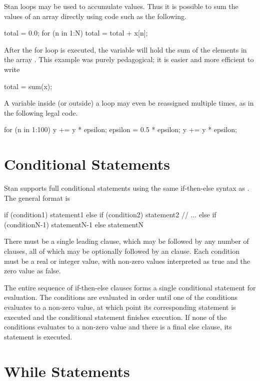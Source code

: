 Stan loops may be used to accumulate values.  Thus it is possible to
sum the values of an array directly using code such as the
following.
%
\begin{stancode}
total = 0.0;
for (n in 1:N)
  total = total + x[n];
\end{stancode}
%
After the for loop is executed, the variable  will hold
the sum of the elements in the array .  This example was
purely pedagogical; it is easier and more efficient to write
%
\begin{stancode}
total = sum(x);
\end{stancode}

A variable inside (or outside) a loop may even be reassigned multiple
times, as in the following legal code.
%
\begin{stancode}
for (n in 1:100) {
  y += y * epsilon;
  epsilon = 0.5 * epsilon;
  y += y * epsilon;
}
\end{stancode}

\section{Conditional Statements}

Stan supports full conditional statements using
the same if-then-else syntax as \Cpp.  The general format is
%
\begin{stancode}
if (condition1)
  statement1
else if (condition2)
  statement2
// ...
else if (conditionN-1)
  statementN-1
else
  statementN
\end{stancode}
%
There must be a single leading  clause, which may be followed
by any number of  clauses, all of which may be
optionally followed by an  clause.  Each condition must be
a real or integer value, with non-zero values interpreted as true and
the zero value as false.

The entire sequence of if-then-else clauses forms a single conditional
statement for evaluation.  The conditions are evaluated in order
until one of the conditions evaluates to a non-zero value, at which
point its corresponding statement is executed and the conditional
statement finishes execution.  If none of the conditions evaluates to
a non-zero value and there is a final else clause, its statement is
executed.

\section{While Statements}

